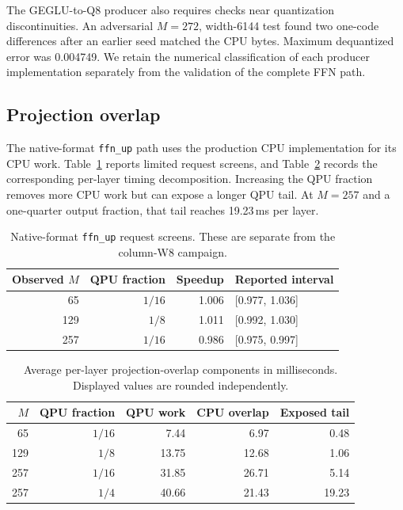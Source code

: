 \documentclass[sigplan,screen,review]{acmart}
\begin{document}
The GEGLU-to-Q8 producer also requires checks near quantization discontinuities. An adversarial \(M=272\), width-6144 test found two one-code differences after an earlier seed matched the CPU bytes. Maximum dequantized error was 0.004749. We retain the numerical classification of each producer implementation separately from the validation of the complete FFN path.

\subsection{Projection overlap}
\label{app:ffn}

The native-format \texttt{ffn\_up} path uses the production CPU implementation for its CPU work. Table~\ref{tab:exact-up} reports limited request screens, and Table~\ref{tab:overlap-components} records the corresponding per-layer timing decomposition. Increasing the QPU fraction removes more CPU work but can expose a longer QPU tail. At \(M=257\) and a one-quarter output fraction, that tail reaches 19.23\,ms per layer.

\begin{table}[t]
\centering
\caption{Native-format \texttt{ffn\_up} request screens. These are separate from the column-W8 campaign.}
\label{tab:exact-up}
\small
\begin{tabular}{@{}rrrl@{}}
\toprule
Observed $M$ & QPU fraction & Speedup & Reported interval \\
\midrule
65 & $1/16$ & 1.006 & [0.977, 1.036] \\
129 & $1/8$ & 1.011 & [0.992, 1.030] \\
257 & $1/16$ & 0.986 & [0.975, 0.997] \\
\bottomrule
\end{tabular}
\end{table}

\begin{table}[t]
\centering
\caption{Average per-layer projection-overlap components in milliseconds. Displayed values are rounded independently.}
\label{tab:overlap-components}
\small
\begin{tabular}{@{}rrrrr@{}}
\toprule
$M$ & QPU fraction & QPU work & CPU overlap & Exposed tail \\
\midrule
65 & $1/16$ & 7.44 & 6.97 & 0.48 \\
129 & $1/8$ & 13.75 & 12.68 & 1.06 \\
257 & $1/16$ & 31.85 & 26.71 & 5.14 \\
257 & $1/4$ & 40.66 & 21.43 & 19.23 \\
\bottomrule
\end{tabular}
\end{table}
\end{document}
